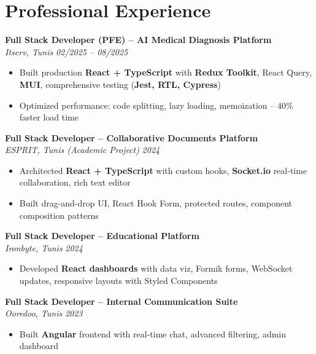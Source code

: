 \documentclass[10pt,a4paper]{article}
\begin{document}
\section*{Professional Experience}
{\small

\textbf{Full Stack Developer (PFE) -- AI Medical Diagnosis Platform}\\[1pt]
\textit{Itserv, Tunis} \hfill \textit{02/2025 -- 08/2025}
\begin{itemize}[leftmargin=12pt,itemsep=2pt,topsep=3pt,parsep=0pt]
  \item Built production \textbf{React + TypeScript} with \textbf{Redux Toolkit}, React Query, \textbf{MUI}, comprehensive testing (\textbf{Jest, RTL, Cypress})
  \item Optimized performance: code splitting, lazy loading, memoization -- 40\% faster load time
\end{itemize}

\vspace{3pt}
\textbf{Full Stack Developer -- Collaborative Documents Platform}\\[1pt]
\textit{ESPRIT, Tunis (Academic Project)} \hfill \textit{2024}
\begin{itemize}[leftmargin=12pt,itemsep=2pt,topsep=3pt,parsep=0pt]
  \item Architected \textbf{React + TypeScript} with custom hooks, \textbf{Socket.io} real-time collaboration, rich text editor
  \item Built drag-and-drop UI, React Hook Form, protected routes, component composition patterns
\end{itemize}

\vspace{3pt}
\textbf{Full Stack Developer -- Educational Platform}\\[1pt]
\textit{Ironbyte, Tunis} \hfill \textit{2024}
\begin{itemize}[leftmargin=12pt,itemsep=2pt,topsep=3pt,parsep=0pt]
  \item Developed \textbf{React dashboards} with data viz, Formik forms, WebSocket updates, responsive layouts with Styled Components
\end{itemize}

\vspace{3pt}
\textbf{Full Stack Developer -- Internal Communication Suite}\\[1pt]
\textit{Ooredoo, Tunis} \hfill \textit{2023}
\begin{itemize}[leftmargin=12pt,itemsep=2pt,topsep=3pt,parsep=0pt]
  \item Built \textbf{Angular} frontend with real-time chat, advanced filtering, admin dashboard
\end{itemize}

}
\end{document}

